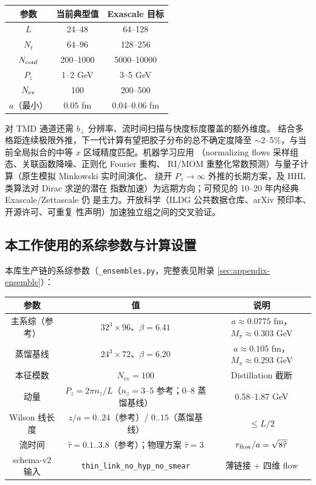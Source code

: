 \documentclass[11pt,a4paper]{ctexart}
\newcommand{\code}[1]{\texttt{#1}}
\newcommand{\bperp}{b_{\perp}}
\newcommand{\zzh}{\widehat{\tau}}
\begin{document}
\begin{center}
\small
\begin{tabular}{c c c}
\toprule
\textbf{参数} & \textbf{当前典型值} & \textbf{Exascale 目标} \\
\midrule
$L$ & 24--48 & 64--128 \\
$N_t$ & 64--96 & 128--256 \\
$N_{\rm conf}$ & 200--1000 & 5000--10000 \\
$P_z$ & 1--2 GeV & 3--5 GeV \\
$N_{\rm ev}$ & 100 & 200--500 \\
$a$（最小） & 0.05 fm & 0.04--0.06 fm \\
\bottomrule
\end{tabular}
\end{center}
对 TMD 通道还需 $\bperp$ 分辨率、流时间扫描与快度标度覆盖的额外维度。
结合多格距连续极限外推，下一代计算有望把胶子分布的总不确定度降至
$\sim2$--5\%，与当前全局拟合的中等 $x$ 区域精度匹配。机器学习应用
（normalizing flows 采样组态、关联函数降噪、正则化 Fourier 重构、
RI/MOM 重整化常数预测）与量子计算（原生模拟 Minkowski 实时间演化、
绕开 $P_z\to\infty$ 外推的长期方案，及 HHL 类算法对 Dirac 求逆的潜在
指数加速）为远期方向；可预见的 10--20 年内经典 Exascale/Zettascale 仍
是主力。开放科学（ILDG 公共数据仓库、arXiv 预印本、开源许可、可重复
性声明）加速独立组之间的交叉验证。

\subsection{本工作使用的系综参数与计算设置}

本库生产链的系综参数（\code{\_ensembles.py}，完整表见附录
\ref{sec:appendix-ensemble}）：
\begin{center}
\small
\begin{tabular}{c c c}
\toprule
\textbf{参数} & \textbf{值} & \textbf{说明} \\
\midrule
主系综（参考） & $32^3\times96$、$\beta=6.41$ & $a\approx0.0775$ fm，$M_\pi\approx0.303$ GeV \\
蒸馏基线 & $24^3\times72$、$\beta=6.20$ & $a\approx0.105$ fm，$M_\pi\approx0.293$ GeV \\
本征模数 & $N_{\text{ev}}=100$ & Distillation 截断 \\
动量 & $P_z=2\pi n_z/L$（$n_z=3$--$5$ 参考；$0$--$8$ 蒸馏基线） & 0.58--1.87 GeV \\
Wilson 线长度 & $z/a=0..24$（参考）/ $0..15$（蒸馏基线） & $\le L/2$ \\
流时间 & $\zzh=0.1..3.8$（参考）；物理方案 $\zzh=3$ & $r_{\rm flow}/a=\sqrt{8\zzh}$ \\
schema-v2 输入 & \code{thin\_link\_no\_hyp\_no\_smear} & 薄链接 + 四维 flow \\
\bottomrule
\end{tabular}
\end{center}
\end{document}
